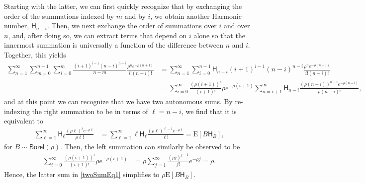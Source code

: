 \documentclass[opre,nonblindrev]{informs3_no_remark}
\newcommand{\E}[1]{{\mathrm{E}\left[#1\right]}}
\begin{document}
Starting with the latter, we can first quickly recognize that by exchanging the order of the summations indexed by $m$ and by $i$, we obtain another Harmonic number, $\mathsf{H}_{n-i}$. Then, we next exchange the order of summations over $i$ and over $n$, and, after doing so, we can extract terms that depend on $i$ alone so that the innermost summation is universally a function of the difference between $n$ and $i$. Together, this yields
\begin{align*}
\sum_{n=1}^\infty
\sum_{m=0}^{n-1}
\sum_{i=0}^m
\frac{\left({i+1}\right)^{i-1}
\left({n-i}\right)^{n-i}}{n-m}
 \frac{\rho^n e^{-\rho(n+1)}}{i!(n-i)!}
 \nonumber
 &=
 \sum_{n=1}^\infty
\sum_{i=0}^{n-1}
\mathsf{H}_{n-i}
\left({i+1}\right)^{i-1}
\left({n-i}\right)^{n-i}
 \frac{\rho^n e^{-\rho(n+1)}}{i!(n-i)!}
 \\
  &=
 \sum_{i=0}^\infty
 \frac{\left(\rho({i+1})\right)^{i} }{(i+1)!}
 \rho e^{-\rho(i+1)}
\sum_{n=i+1}^{\infty}
\mathsf{H}_{n-i}
 \frac{\left(\rho(n-i)\right)^{n-i} e^{-\rho(n-i)}}{\rho(n-i)!}
 ,
\end{align*}
and at this point we can recognize that we have two autonomous sums. By re-indexing the right summation to be in terms of $\ell = n - i$, we find that it is equivalent to
\begin{align}
\sum_{\ell=1}^{\infty}
\mathsf{H}_{\ell}
 \frac{\left(\rho\ell\right)^{\ell} e^{-\rho\ell}}{\rho \ell!}
 &=
 \sum_{\ell=1}^{\infty}
\ell \mathsf{H}_{\ell}
 \frac{\left(\rho\ell\right)^{\ell-1} e^{-\rho\ell}}{ \ell!}
 =
 \E{B \mathsf{H}_B}
 ,
\end{align}
for $B \sim \mathsf{Borel}(\rho)$. Then, the left summation can similarly be observed to be 
\begin{align}
 \sum_{i=0}^\infty
 \frac{\left(\rho({i+1})\right)^{i} }{(i+1)!}
 \rho e^{-\rho(i+1)}
 &=
 \rho
  \sum_{j=1}^\infty
 \frac{\left(\rho j\right)^{j-1} }{j!}
 e^{-\rho j}
 =
 \rho
 .
\end{align}
Hence, the latter sum in \eqref{twoSumEq1} simplifies to $\rho \E{B \mathsf{H}_B}$.
\end{document}
